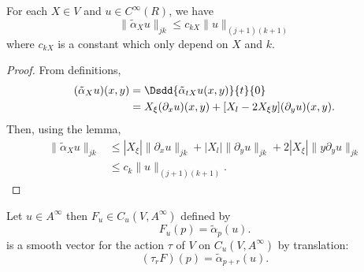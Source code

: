 \begin{proposition}
For each $X\in V$ and $u\in C^{\infty}(R)$, we have
\begin{equation}
\| \tilde\alpha_Xu \|_{jk}\leq c_{kX}\| u \|_{(j+1)(k+1)}
\end{equation}
where $c_{kX}$ is a constant which only depend on $X$ and $k$.
\end{proposition}

\begin{proof}
From definitions,
\begin{equation}
\begin{split}
(\tilde\alpha_Xu)(x,y)&=\Dsdd{ \tilde\alpha_{tX}u(x,y) }{t}{0}\\
		&=X_{\xi}(\partial_xu)(x,y)+[X_l-2X_{\xi}y](\partial_yu)(x,y).
\end{split}
\end{equation}
Then, using the lemma,
\begin{equation}
\begin{split}
\| \tilde\alpha_Xu \|_{jk}&\leq | X_{\xi} |\| \partial_xu \|_{jk}+| X_l |\| \partial_yu \|_{jk}+2| X_{\xi} |\| y\partial_yu \|_{jk}\\
			&\leq c_k\| u \|_{(j+1)(k+1)}.
\end{split}
\end{equation}

\end{proof}


\begin{proposition}
Let $u\in A^{\infty}$ then $F_u\in C_u(V,A^{\infty})$ defined by
\[ 
  F_u(p)=\tilde\alpha_p(u).
\]
is a smooth vector for the action $\tau$ of $V$ on $C_u(V,A^{\infty})$ by translation:
\[ 
  (\tau_rF)(p)=\tilde\alpha_{p+r}(u).
\]

\end{proposition}

